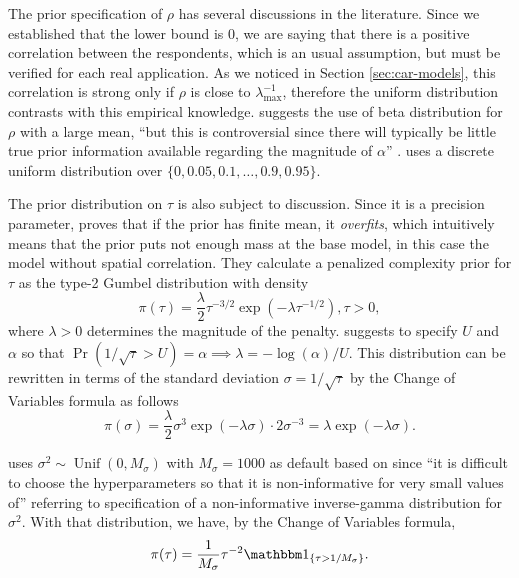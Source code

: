 The prior specification of $\rho$ has several discussions in the literature.
Since we established that the lower bound is 0, we are saying that there is a
positive correlation between the respondents, which is an usual assumption,
but must be verified for each real application. As we noticed in Section
\ref{sec:car-models}, this correlation is strong only if $\rho$ is close to
$\lambda_{\max}^{-1}$, therefore the uniform distribution contrasts with
this empirical knowledge. \textcite[p. 177]{banerjee2003hierarchical} suggests
the use of beta distribution for $\rho$ with a large mean, ``but this is
controversial since there will typically be little true prior information
available regarding the magnitude of $\alpha$'' \cite[$\alpha$ is the
  parameter $\rho$ in our notation.][p.
  177]{banerjee2003hierarchical}. \textcite[p. 81]{lee2011comparison} uses a
discrete uniform distribution over $\{0, 0.05, 0.1, \dots, 0.9, 0.95\}$.

The prior distribution on $\tau$ is also subject to discussion. Since it is a
precision parameter, \textcite[p. 9, Theorem 1]{simpson2017penalising} proves
that if the prior has finite mean, it {\em overfits}, which intuitively means
that the prior puts not enough mass at the base model, in this case the model
without spatial correlation. They calculate a penalized complexity prior for
$\tau$ as the type-2 Gumbel distribution with density
\begin{equation}
  \label{eq:gumbel-distribution}
  \pi(\tau) = \frac{\lambda}{2}\tau^{-3/2}\exp(-\lambda \tau^{-1/2}), \tau > 0,
\end{equation}
where $\lambda > 0$ determines the magnitude of the penalty.
\textcite[p. 9]{simpson2017penalising} suggests to specify $U$ and
$\alpha$ so that $\Pr(1 / \sqrt{\tau} > U) = \alpha \implies \lambda =
  -\log(\alpha)/U$. This distribution can be rewritten in terms of the standard
deviation $\sigma = 1/ \sqrt{\tau}$ by the Change of Variables
formula as follows
\begin{equation}
  \label{eq:standard-deviation-gumbel}
  \pi(\sigma) = \frac{\lambda}{2}\sigma^{3}\exp(-\lambda \sigma) \cdot 2\sigma^{-3} = \lambda \exp(-\lambda \sigma).
\end{equation}

\textcite[p. 5]{lee2013carbayes} uses $\sigma^2 \sim \operatorname{Unif}(0,
  M_{\sigma})$ with $M_{\sigma} = 1000$ as default based on
\textcite{gelman2006prior} since ``it is difficult to choose the
hyperparameters so that it is non-informative for very small values of''
\cite[p. 4]{lee2013carbayes} referring to specification of a non-informative
inverse-gamma distribution for $\sigma^2$. With that distribution, we
have, by the Change of Variables formula,
$$
  \pi(\tau) = \frac{1}{M_{\sigma}}\tau^{-2}\ind_{\{\tau > 1/M_{\sigma}\}}.
$$

